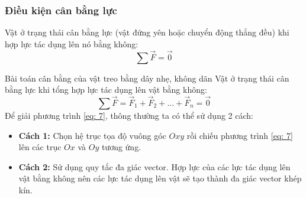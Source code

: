 \begin{tomtat}
\subsubsection{Điều kiện cân bằng lực}
Vật ở trạng thái cân bằng lực (vật đứng yên hoặc chuyển động thẳng đều) khi hợp lực tác dụng lên nó bằng không:
\begin{equation}
	\label{eq: 6}
	\sum\vec{F}=\vec{0}
\end{equation}
\begin{dang}{Bài toán cân bằng của vật treo bằng dây nhẹ, không dãn}
	Vật ở trạng thái cân bằng lực khi tổng hợp lực tác dụng lên vật bằng không:
	\begin{equation}
		\label{eq: 7}
		\sum\vec{F}=\vec{F}_1+\vec{F}_2+\dots+\vec{F}_n=\vec{0}
	\end{equation}
	Để giải phương trình \eqref{eq: 7}, thông thường ta có thể sử dụng 2 cách:
	\begin{itemize}
		\item \textbf{Cách 1:} Chọn hệ trục tọa độ vuông góc $Oxy$ rồi chiếu phương trình \eqref{eq: 7} lên các trục $Ox$ và $Oy$ tương ứng.
		\item \textbf{Cách 2:} Sử dụng quy tắc đa giác vector. Hợp lực của các lực tác dụng lên vật bằng không nên các lực tác dụng lên vật sẽ tạo thành đa giác vector khép kín.
	\end{itemize}
\end{dang}
\begin{vd}

\end{vd}
\end{tomtat}
